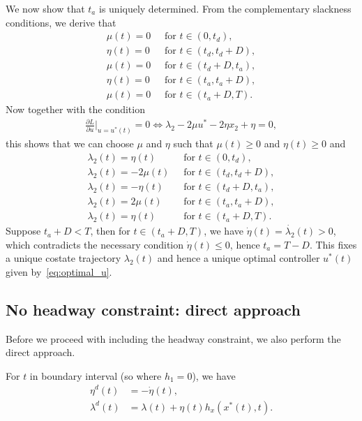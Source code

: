 \documentclass[a4paper]{article}
\theoremstyle{definition}
\theoremstyle{plain}
\begin{document}
We now show that $t_{a}$ is uniquely determined.
%
From the complementary slackness conditions, we derive that
\begin{align*}
  \mu(t) = 0 \; & \text{ for } t \in (0, t_{d}) , \\
  \eta(t) = 0 \;& \text{ for } t \in (t_{d}, t_{d} + D) , \\
  \mu(t) = 0 \; & \text{ for } t \in (t_{d} + D, t_{a}) , \\
  \eta(t) = 0 \;& \text{ for } t \in (t_{a}, t_{a} + D) , \\
  \mu(t) = 0 \; & \text{ for } t \in (t_{a} + D, T) .
\end{align*}
%
Now together with the condition
\begin{align*}
  \frac{\partial L}{\partial u} |_{u=u^{*}(t)} = 0 \iff \lambda_{2} - 2 \mu u^{*} - 2 \eta x_{2} + \eta = 0 ,
\end{align*}
this shows that we can choose $\mu$ and $\eta$ such that $\mu(t) \geq 0$ and $\eta(t) \geq 0$ and
\begin{align*}
  \lambda_{2}(t) = \eta(t) \; & \text{ for } t \in (0, t_{d}) , \\
  \lambda_{2}(t) = -2 \mu(t) \; & \text{ for } t \in (t_{d}, t_{d} + D) , \\
  \lambda_{2}(t) = -\eta(t) \; & \text{ for } t \in (t_{d} + D, t_{a}) , \\
  \lambda_{2}(t) = 2 \mu(t) \; & \text{ for } t \in (t_{a}, t_{a} + D) , \\
  \lambda_{2}(t) = \eta(t) \;& \text{ for } t \in (t_{a} + D, T) .
\end{align*}
%
Suppose $t_{a} + D < T$, then for $t \in (t_{a} + D, T)$, we have
$\dot{\eta}(t) = \dot{\lambda_{2}}(t) > 0$, which contradicts the necessary
condition $\dot{\eta}(t) \leq 0$, hence $t_{a}= T - D$. This fixes a unique
costate trajectory $\lambda_{2}(t)$ and hence a unique optimal controller
$u^{*}(t)$ given by~\eqref{eq:optimal_u}.


\subsection{No headway constraint: direct approach}

Before we proceed with including the headway constraint, we also perform the direct approach.

For $t$ in boundary interval (so where $h_{1}=0$), we have
\begin{align*}
  \eta^{d}(t) &= - \dot{\eta}(t) , \\
  \lambda^{d}(t) &= \lambda(t) + \eta(t)h_{x}(x^{*}(t), t) .
\end{align*}
\end{document}
